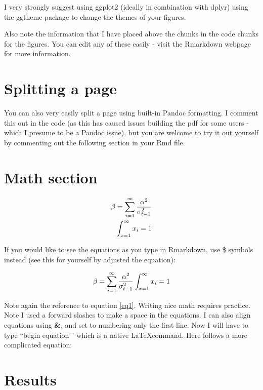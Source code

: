 \documentclass[11pt,preprint, authoryear]{elsarticle}
\numberwithin{equation}{section}
\numberwithin{figure}{section}
\numberwithin{table}{section}
\begin{document}
I very strongly suggest using ggplot2 (ideally in combination with
dplyr) using the ggtheme package to change the themes of your figures.

Also note the information that I have placed above the chunks in the
code chunks for the figures. You can edit any of these easily - visit
the Rmarkdown webpage for more information.

\hypertarget{splitting-a-page}{%
\section{Splitting a page}\label{splitting-a-page}}

You can also very easily split a page using built-in Pandoc formatting.
I comment this out in the code (as this has caused issues building the
pdf for some users - which I presume to be a Pandoc issue), but you are
welcome to try it out yourself by commenting out the following section
in your Rmd file.

\hypertarget{math-section}{%
\section{Math section}\label{math-section}}

\begin{align}
\beta = \sum_{i = 1}^{\infty}\frac{\alpha^2}{\sigma_{t-1}^2} \label{eq1} \\
\int_{x = 1}^{\infty}x_{i} = 1 \notag
\end{align}

If you would like to see the equations as you type in Rmarkdown, use \$
symbols instead (see this for yourself by adjusted the equation):

\[
\beta = \sum_{i = 1}^{\infty}\frac{\alpha^2}{\sigma_{t-1}^2} \\
\int_{x = 1}^{\infty}x_{i} = 1
\]

Note again the reference to equation \ref{eq1}. Writing nice math
requires practice. Note I used a forward slashes to make a space in the
equations. I can also align equations using \textbf{\&}, and set to
numbering only the first line. Now I will have to type ``begin
equation'\,' which is a native \LaTeX command. Here follows a more
complicated equation:

\hypertarget{results}{%
\section{Results}\label{results}}
\end{document}
